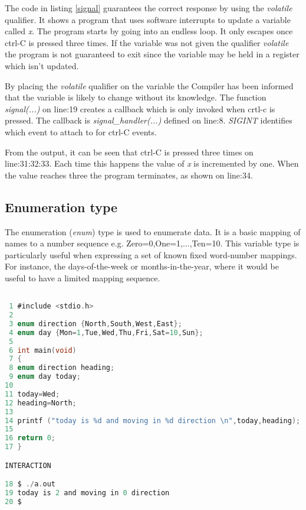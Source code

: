 The code in listing \ref{signal} guarantees the correct response by using the \textit{volatile} qualifier. It shows a program that uses software interrupts to update a variable called \textit{x}. The program starts by going into an endless loop. It only escapes once ctrl-C is pressed three times. If the variable was not given the qualifier \textit{volatile} the program is not guaranteed to exit since the variable may be held in a register which isn't updated.  


By placing the \textit{volatile} qualifier on the variable the Compiler has been informed that the variable is likely to change without its knowledge. The function \textit{signal(...)} on line:19 creates a callback which is only invoked when crtl-c is pressed. The callback is \textit{signal\_handler(...)} defined on line:8. \textit{SIGINT} identifies which event to attach to for ctrl-C events.

From the output, it can be seen that ctrl-C is pressed three times on line:31:32:33. Each time this happens the value of \textit{x} is incremented by one. When the value reaches three the program terminates, as shown on line:34.


\subsection{Enumeration type}
 

The enumeration (\textit{enum}) type is used to enumerate data. It is a basic mapping of names to a number sequence e.g. Zero=0,One=1,...,Ten=10. This variable type is particularly useful when expressing a set of known fixed word-number mappings. For instance, the days-of-the-week or months-in-the-year, where it would be useful to have a limited mapping sequence.

\begin{lstlisting}[language=C,showstringspaces=false,caption={File enum.c, enumeration type},captionpos=b,label=enum]

 1 #include <stdio.h>
 2 
 3 enum direction {North,South,West,East};
 4 enum day {Mon=1,Tue,Wed,Thu,Fri,Sat=10,Sun};
 5 
 6 int main(void)
 7 {
 8 enum direction heading;
 9 enum day today;
10 
11 today=Wed;
12 heading=North;
13 
14 printf ("today is %d and moving in %d direction \n",today,heading);
15 
16 return 0;
17 }

INTERACTION

18 $ ./a.out
19 today is 2 and moving in 0 direction 
20 $

\end{lstlisting}

